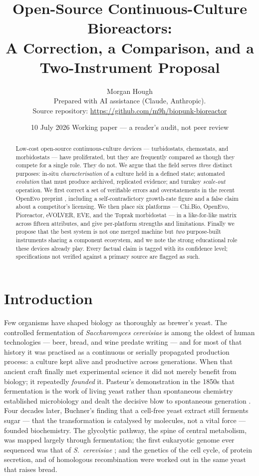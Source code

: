 \documentclass[11pt,a4paper]{article}
\title{\textbf{Open-Source Continuous-Culture Bioreactors:\\
A Correction, a Comparison, and a Two-Instrument Proposal}}
\author{Morgan Hough\\[2pt]
  \small Prepared with AI assistance (Claude, Anthropic).\\
  \small Source repository: \url{https://github.com/m9h/biopunk-bioreactor}}
\date{10 July 2026 \quad\textbullet\quad \small Working paper --- a reader's audit, not peer review}
\begin{document}
\maketitle

\begin{abstract}
\noindent
Low-cost open-source continuous-culture devices --- turbidostats, chemostats, and
morbidostats --- have proliferated, but they are frequently compared as though they compete
for a single role. They do not. We argue that the field serves \emph{three} distinct
purposes: in-situ \emph{characterisation} of a culture held in a defined state; automated
\emph{evolution} that must produce archived, replicated evidence; and turnkey
\emph{scale-out} operation. We first correct a set of verifiable errors and overstatements in
the recent OpenEvo preprint \cite{cocioba2026openevo}, including a self-contradictory
growth-rate figure and a false claim about a competitor's licensing. We then place six
platforms --- Chi.Bio, OpenEvo, Pioreactor, eVOLVER, EVE, and the Toprak morbidostat --- in a
like-for-like matrix across fifteen attributes, and give per-platform strengths and
limitations. Finally we propose that the best system is not one merged machine but
\emph{two} purpose-built instruments sharing a component ecosystem, and we note the strong
educational role these devices already play. Every factual claim is tagged with its
confidence level; specifications not verified against a primary source are flagged as such.
\end{abstract}

\section{Introduction}

Few organisms have shaped biology as thoroughly as brewer's yeast. The controlled fermentation
of \emph{Saccharomyces cerevisiae} is among the oldest of human technologies --- beer, bread,
and wine predate writing --- and for most of that history it was practised as a continuous or
serially propagated production process: a culture kept alive and productive across generations.
When that ancient craft finally met experimental science it did not merely benefit from biology;
it repeatedly \emph{founded} it. Pasteur's demonstration in the 1850s that fermentation is the
work of living yeast rather than spontaneous chemistry established microbiology and dealt the
decisive blow to spontaneous generation \cite{pasteur1857}. Four decades later, Buchner's finding
that a cell-free yeast extract still ferments sugar --- that the transformation is catalysed by
molecules, not a vital force --- founded biochemistry. The glycolytic pathway, the spine of
central metabolism, was mapped largely through fermentation; the first eukaryotic genome ever
sequenced was that of \emph{S.~cerevisiae} \cite{goffeau1996}; and the genetics of the cell
cycle, of protein secretion, and of homologous recombination were worked out in the same yeast
that raises bread.
\end{document}
